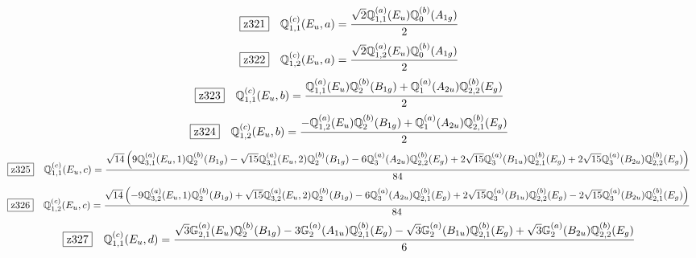 \documentclass[fleqn,10pt,landscape]{jsarticle}
\begin{document}
\begin{dmath*}
\hspace*{3mm}\fbox{z321}\quad \mathbb{Q}_{1,1}^{(c)}(E_{u},a)=\frac{\sqrt{2} \mathbb{Q}_{1,1}^{(a)}(E_{u}) \mathbb{Q}_{0}^{(b)}(A_{1g})}{2}
\end{dmath*}
\begin{dmath*}
\hspace*{3mm}\fbox{z322}\quad \mathbb{Q}_{1,2}^{(c)}(E_{u},a)=\frac{\sqrt{2} \mathbb{Q}_{1,2}^{(a)}(E_{u}) \mathbb{Q}_{0}^{(b)}(A_{1g})}{2}
\end{dmath*}
\begin{dmath*}
\hspace*{3mm}\fbox{z323}\quad \mathbb{Q}_{1,1}^{(c)}(E_{u},b)=\frac{\mathbb{Q}_{1,1}^{(a)}(E_{u}) \mathbb{Q}_{2}^{(b)}(B_{1g}) + \mathbb{Q}_{1}^{(a)}(A_{2u}) \mathbb{Q}_{2,2}^{(b)}(E_{g})}{2}
\end{dmath*}
\begin{dmath*}
\hspace*{3mm}\fbox{z324}\quad \mathbb{Q}_{1,2}^{(c)}(E_{u},b)=\frac{- \mathbb{Q}_{1,2}^{(a)}(E_{u}) \mathbb{Q}_{2}^{(b)}(B_{1g}) + \mathbb{Q}_{1}^{(a)}(A_{2u}) \mathbb{Q}_{2,1}^{(b)}(E_{g})}{2}
\end{dmath*}
\begin{dmath*}
\hspace*{3mm}\fbox{z325}\quad \mathbb{Q}_{1,1}^{(c)}(E_{u},c)=\frac{\sqrt{14} \left(9 \mathbb{Q}_{3,1}^{(a)}(E_{u},1) \mathbb{Q}_{2}^{(b)}(B_{1g}) - \sqrt{15} \mathbb{Q}_{3,1}^{(a)}(E_{u},2) \mathbb{Q}_{2}^{(b)}(B_{1g}) - 6 \mathbb{Q}_{3}^{(a)}(A_{2u}) \mathbb{Q}_{2,2}^{(b)}(E_{g}) + 2 \sqrt{15} \mathbb{Q}_{3}^{(a)}(B_{1u}) \mathbb{Q}_{2,1}^{(b)}(E_{g}) + 2 \sqrt{15} \mathbb{Q}_{3}^{(a)}(B_{2u}) \mathbb{Q}_{2,2}^{(b)}(E_{g})\right)}{84}
\end{dmath*}
\begin{dmath*}
\hspace*{3mm}\fbox{z326}\quad \mathbb{Q}_{1,2}^{(c)}(E_{u},c)=\frac{\sqrt{14} \left(- 9 \mathbb{Q}_{3,2}^{(a)}(E_{u},1) \mathbb{Q}_{2}^{(b)}(B_{1g}) + \sqrt{15} \mathbb{Q}_{3,2}^{(a)}(E_{u},2) \mathbb{Q}_{2}^{(b)}(B_{1g}) - 6 \mathbb{Q}_{3}^{(a)}(A_{2u}) \mathbb{Q}_{2,1}^{(b)}(E_{g}) + 2 \sqrt{15} \mathbb{Q}_{3}^{(a)}(B_{1u}) \mathbb{Q}_{2,2}^{(b)}(E_{g}) - 2 \sqrt{15} \mathbb{Q}_{3}^{(a)}(B_{2u}) \mathbb{Q}_{2,1}^{(b)}(E_{g})\right)}{84}
\end{dmath*}
\begin{dmath*}
\hspace*{3mm}\fbox{z327}\quad \mathbb{Q}_{1,1}^{(c)}(E_{u},d)=\frac{\sqrt{3} \mathbb{G}_{2,1}^{(a)}(E_{u}) \mathbb{Q}_{2}^{(b)}(B_{1g}) - 3 \mathbb{G}_{2}^{(a)}(A_{1u}) \mathbb{Q}_{2,1}^{(b)}(E_{g}) - \sqrt{3} \mathbb{G}_{2}^{(a)}(B_{1u}) \mathbb{Q}_{2,1}^{(b)}(E_{g}) + \sqrt{3} \mathbb{G}_{2}^{(a)}(B_{2u}) \mathbb{Q}_{2,2}^{(b)}(E_{g})}{6}
\end{dmath*}
\end{document}
